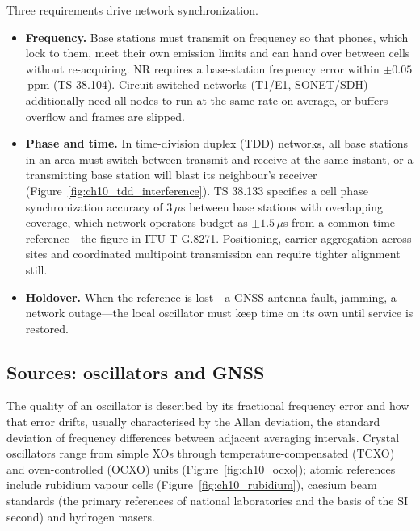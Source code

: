 Three requirements drive network synchronization.
\begin{itemize}
\item \textbf{Frequency.} Base stations must transmit on frequency so that phones, which lock to
them, meet their own emission limits and can hand over between cells without re-acquiring. NR
requires a base-station frequency error within $\pm0.05$\,ppm (TS 38.104). Circuit-switched networks
(T1/E1, SONET/SDH) additionally need all nodes to run at the same rate on average, or buffers overflow
and frames are slipped.
\item \textbf{Phase and time.} In time-division duplex (TDD) networks, all base stations in an area
must switch between transmit and receive at the same instant, or a transmitting base station will
blast its neighbour's receiver (Figure~\ref{fig:ch10_tdd_interference}). TS 38.133 specifies a cell
phase synchronization accuracy of 3\,$\mu$s between base stations with overlapping coverage, which
network operators budget as $\pm1.5\,\mu$s from a common time reference---the figure in ITU-T G.8271.
Positioning, carrier aggregation across sites and coordinated multipoint transmission can require
tighter alignment still.
\item \textbf{Holdover.} When the reference is lost---a GNSS antenna fault, jamming, a network
outage---the local oscillator must keep time on its own until service is restored.
\end{itemize}


\subsection{Sources: oscillators and GNSS}

The quality of an oscillator is described by its fractional frequency error and how that error
drifts, usually characterised by the Allan deviation, the standard deviation of frequency
differences between adjacent averaging intervals. Crystal oscillators range from simple XOs through
temperature-compensated (TCXO) and oven-controlled (OCXO) units (Figure~\ref{fig:ch10_ocxo}); atomic
references include rubidium vapour cells (Figure~\ref{fig:ch10_rubidium}), caesium beam standards
(the primary references of national laboratories and the basis of the SI second) and hydrogen masers.


